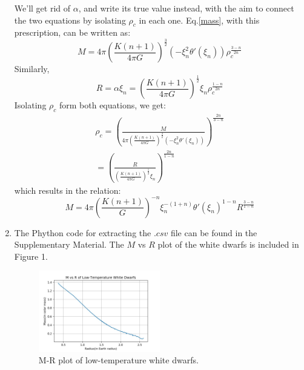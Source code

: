 \documentclass[aps,twocolumn,showpacs,preprintnumbers,nofootinbib,prl,superscriptaddress,groupedaddress]{revtex4-2}
\begin{document}
\begin{enumerate}[label=(\alph*)]
    We'll get rid of $\alpha$, and write its true value instead, with the aim to connect the two equations by isolating $\rho_{c}$ in each one. Eq.\eqref{mass}, with this prescription, can be written as:
    \begin{equation}
        M = 4\pi \left(\frac{K(n+1)}{4\pi G}\right)^{\frac{3}{2}} \left(-\xi_{n}^{2}\theta '(\xi_{n})\right) \rho_{c}^{\frac{3-n}{2n}}
    \end{equation}
    Similarly, 
    \begin{equation}
        R = \alpha\xi_{n} = \left(\frac{K(n+1)}{4\pi G}\right)^{\frac{1}{2}} \xi_{n} \rho_{c}^{\frac{1-n}{2n}}
    \end{equation}
    Isolating $\rho_{c}$ form both equations, we get:
    \begin{align}
        \rho_{c} = \left( \frac{M}{4\pi \left(\frac{K(n+1)}{4\pi G}\right)^{\frac{3}{2}} \left(-\xi_{n}^{2}\theta '(\xi_{n})\right)} \right)^{\frac{2n}{3-n}}     \nonumber \\
        = \left( \frac{R}{\left(\frac{K(n+1)}{4\pi G}\right)^{\frac{1}{2}} \xi_{n}} \right)^{\frac{2n}{1-n}}
    \end{align}
    which results in the relation:
    \begin{equation}
        M = 4\pi \left(\frac{K(n+1)}{G}\right)^{-n} \xi_{n}^{-(1+n)} {\theta '(\xi_{n})}^{1-n} R^{\frac{3-n}{1-n}}
    \end{equation}
    \item The Phython code for extracting the $.csv$ file can be found in the Supplementary Material. The $M$ vs $R$ plot of the white dwarfs is included in Figure 1.
    \begin{figure}[h] 
    \centering
    \includegraphics[width=0.5\textwidth]{WDMR.jpg}
    \caption{M-R plot of low-temperature white dwarfs.}
    \end{figure}
    
\end{enumerate}
\end{document}
